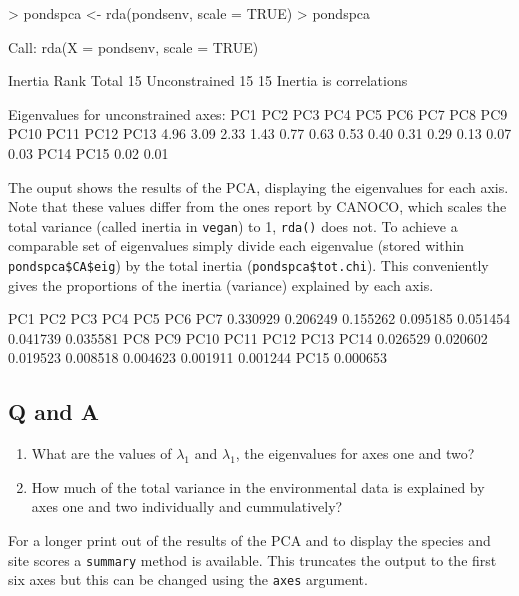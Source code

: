 \documentclass[a4paper,10pt]{article}
\newcommand{\rda}{\texttt{rda()}\xspace}
\newcommand{\vegan}{\texttt{vegan}\xspace}
\begin{document}
\begin{Schunk}
\begin{Sinput}
> pondspca <- rda(pondsenv, scale = TRUE)
> pondspca
\end{Sinput}
\begin{Soutput}
Call: rda(X = pondsenv, scale = TRUE)

              Inertia Rank
Total              15     
Unconstrained      15   15
Inertia is correlations 

Eigenvalues for unconstrained axes:
 PC1  PC2  PC3  PC4  PC5  PC6  PC7  PC8  PC9 PC10 PC11 PC12 PC13 
4.96 3.09 2.33 1.43 0.77 0.63 0.53 0.40 0.31 0.29 0.13 0.07 0.03 
PC14 PC15 
0.02 0.01 
\end{Soutput}
\end{Schunk}

The ouput shows the results of the PCA, displaying the eigenvalues for each axis. Note that these values differ from the ones report by CANOCO, which scales the total variance (called inertia in \vegan) to 1, \rda does not. To achieve a comparable set of eigenvalues simply divide each eigenvalue (stored within \texttt{pondspca\$CA\$eig}) by the total inertia (\texttt{pondspca\$tot.chi}). This conveniently gives the proportions of the inertia (variance) explained by each axis.
\begin{Schunk}
\begin{Soutput}
     PC1      PC2      PC3      PC4      PC5      PC6      PC7 
0.330929 0.206249 0.155262 0.095185 0.051454 0.041739 0.035581 
     PC8      PC9     PC10     PC11     PC12     PC13     PC14 
0.026529 0.020602 0.019523 0.008518 0.004623 0.001911 0.001244 
    PC15 
0.000653 
\end{Soutput}
\end{Schunk}
\subsection*{Q and A}
\begin{enumerate}
\item What are the values of $\lambda_1$ and $\lambda_1$, the eigenvalues for axes one and two?
\item How much of the total variance in the environmental data is explained by axes one and two individually and cummulatively?
\end{enumerate}

For a longer print out of the results of the PCA and to display the species and site scores a \texttt{summary} method is available. This truncates the output to the first six axes but this can be changed using the \texttt{axes} argument.
\end{document}
